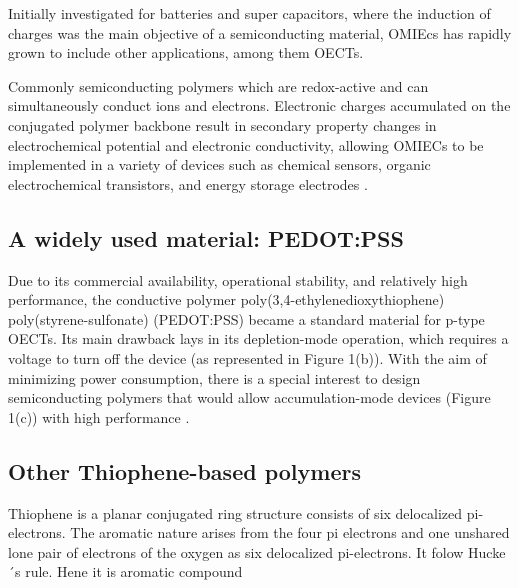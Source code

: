 Initially investigated for batteries and super capacitors, where the induction of charges was the main objective of a semiconducting material, OMIEcs has rapidly grown to include other applications, among them OECTs. \cite{paulsenOrganicMixedIonic2020}

Commonly semiconducting polymers which are redox-active and can simultaneously conduct ions and electrons. Electronic charges accumulated on the conjugated polymer backbone result in secondary property changes in electrochemical potential and electronic conductivity, allowing OMIECs to be implemented in a variety of devices such as chemical sensors, organic electrochemical transistors, and energy storage electrodes \cite{tanOrganicMixedIonic2022}.

\subsection{A widely used material: PEDOT:PSS}
Due to its commercial availability, operational stability, and relatively high performance, the conductive polymer poly(3,4-ethylenedioxythiophene) poly(styrene-sulfonate) (PEDOT:PSS) became a standard material for p-type OECTs. Its main drawback lays in its depletion-mode operation, which requires a voltage to turn off the device (as represented in Figure 1(b)). With the aim of minimizing power consumption, there is a special interest to design semiconducting polymers that would allow accumulation-mode devices (Figure 1(c)) with high performance \cite{nielsenMolecularDesignSemiconducting2016} \cite{tanOrganicMixedIonic2022}.

\subsection{Other Thiophene-based polymers}
Thiophene is a planar conjugated ring structure consists of six delocalized pi-electrons. The aromatic nature arises from the four pi electrons and one unshared lone pair of electrons of the oxygen as six delocalized pi-electrons. It folow Hucke´s rule. Hene it is aromatic compound

